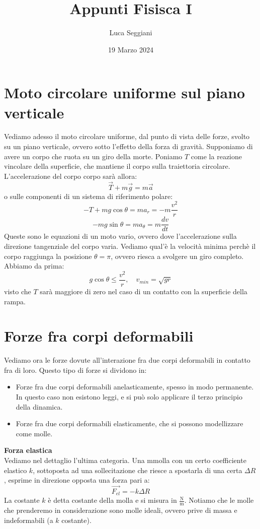 \documentclass[a4paper,12pt]{article}
\title{Appunti Fisisca I}
\author{Luca Seggiani}
\date{19 Marzo 2024}
\begin{document}
\maketitle
\section{Moto circolare uniforme sul piano verticale}
Vediamo adesso il moto circolare uniforme, dal punto di vista delle forze, svolto su un piano verticale, ovvero
sotto l'effetto della forza di gravità. Supponiamo di avere un corpo che ruota su un giro della morte. Poniamo
$T$ come la reazione vincolare della superficie, che mantiene il corpo sulla traiettoria circolare. L'accelerazione 
del corpo corpo sarà allora:
$$ \vec{T} + m\vec{g} = m\vec{a} $$
o sulle componenti di un sistema di riferimento polare:
$$ -T + mg\cos{\theta} = ma_r = -m\frac{v^2}{r} $$
$$ -mg\sin{\theta} = ma_\theta = m \frac{dv}{dt} $$
Queste sono le  equazioni di un moto vario, ovvero dove l'accelerazione sulla direzione tangenziale del corpo varia.
Vediamo qual'è la velocità minima perchè il corpo raggiunga la posizione $\theta = \pi$, ovvero riesca a svolgere un
giro completo. Abbiamo da prima:
$$ g\cos{\theta} \leq \frac{v^2}{r}, \quad v_{min} = \sqrt{gr} $$
visto che $T$ sarà maggiore di zero nel caso di un contatto con la superficie della rampa.
\section{Forze fra corpi deformabili}
Vediamo ora le forze dovute all'interazione fra due corpi deformabili in contatto fra di loro. Questo tipo di forze si
dividono in:
\begin{itemize}
  \item Forze fra due corpi deformabili anelasticamente, spesso in modo permanente. In questo caso non
    esistono leggi, e si può solo applicare il terzo principio della dinamica.
  \item Forze fra due corpi deformabili elasticamente, che si possono modellizzare come molle.
\end{itemize}
\par\smallskip
\textbf{Forza elastica} \\
Vediamo nel dettaglio l'ultima categoria. Una mmolla con un certo coefficiente elastico $k$, sottoposta ad una sollecitazione
che riesce a spostarla di una certa $\Delta R$, esprime in direzione opposta una forza pari a:
$$ \vec{F_{el}} = -k\Delta R$$
La costante $k$ è detta costante della molla e si misura in $\frac{\mathrm{N}}{\mathrm{m}}$. Notiamo che le molle
che prenderemo in considerazione sono molle ideali, ovvero prive di massa e indeformabili (a $k$ costante).
\end{document}
